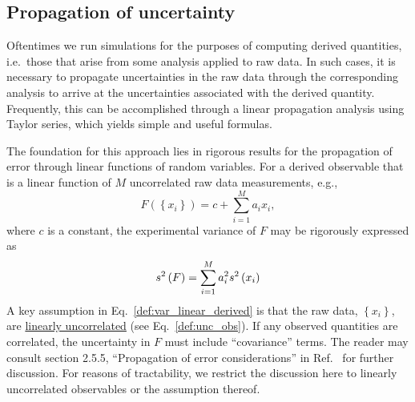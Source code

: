 \subsection{Propagation of uncertainty}

Oftentimes we run simulations for the purposes of computing derived quantities, i.e.\ those that arise from some analysis applied to raw data.  In such cases, it is necessary to propagate uncertainties in the raw data through the corresponding analysis to arrive at the uncertainties associated with the derived quantity.  Frequently, this can be accomplished through a linear propagation analysis using Taylor series, which yields simple and useful formulas.

The foundation for this approach lies in rigorous results for the propagation of error through linear functions of random variables.
For a derived observable that is a linear function of $M$ uncorrelated raw data measurements, e.g.,
%
\begin{equation}
  F\left( \left\{x_i\right\} \right) = c + \sum_{i=1}^M a_i x_i,
  \label{def:linear_derived_obs}
\end{equation}
%
where $c$ is a constant, the experimental variance of $F$ may be rigorously expressed as\cite{NIST_Sematech_eHandbook}
%
\begin{equation}
  s^2\left( F \right) = \sum_{i=1}^M a_i^2 s^2\left( x_i \right)
  \label{def:var_linear_derived}
\end{equation}
%
A key assumption in Eq.~\ref{def:var_linear_derived} is that the raw data, $\left\{x_i\right\}$, are \hyperref[def:unc_obs]{linearly uncorrelated} (see Eq.~\ref{def:unc_obs}). If any observed quantities are correlated, the uncertainty in $F$ must include ``covariance'' terms. The reader may consult section 2.5.5, ``Propagation of error considerations'' in Ref.~\cite{NIST_Sematech_eHandbook} for further discussion. For reasons of tractability, we restrict the discussion here to linearly uncorrelated observables or the assumption thereof.

